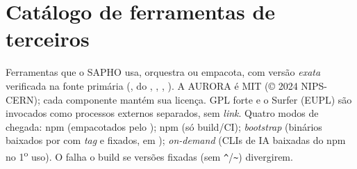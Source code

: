 \section{Catálogo de ferramentas de terceiros}
\label{sec:S12-catalogo-terceiros}

Ferramentas que o SAPHO usa, orquestra ou empacota, com versão \emph{exata}
verificada na fonte primária (,  do
, ,
, ). A AURORA é MIT
(\copyright{} 2024 NIPS-CERN); cada componente mantém sua licença. GPL forte e o
Surfer (EUPL) são invocados como processos externos separados, sem \emph{link}.
Quatro modos de chegada: npm  (empacotados pelo
); npm  (só build/CI); \emph{bootstrap}
(binários baixados por  com \emph{tag} e  fixados,
em ); \emph{on-demand} (CLIs de IA baixadas do npm no 1\textsuperscript{o} uso).
O  falha o build se versões fixadas (sem
\lstinline|^|/\lstinline|~|) divergirem.

